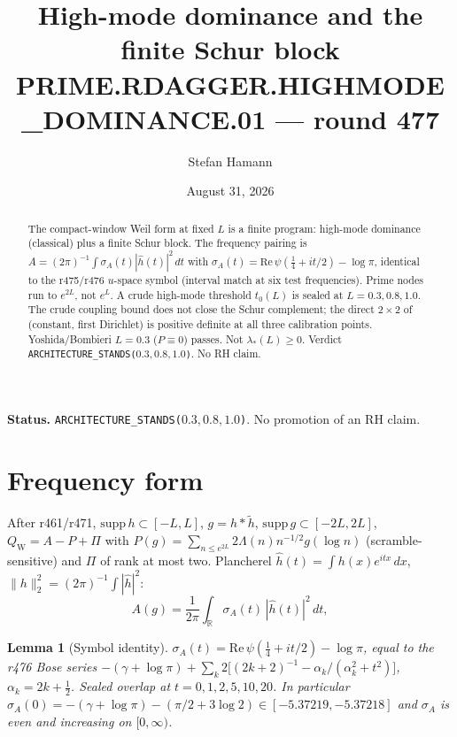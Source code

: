 \documentclass[11pt]{article}
\title{\bfseries High-mode dominance and the finite Schur block\\[2mm]
\large PRIME.RDAGGER.HIGHMODE\_DOMINANCE.01 --- round 477}
\author{Stefan Hamann}
\date{August 31, 2026}
\newtheorem{lemma}{Lemma}
\theoremstyle{remark}
\newcommand{\QW}{Q_{\mathrm W}}
\begin{document}
\maketitle

\begin{abstract}\noindent
The compact-window Weil form at fixed $L$ is a finite program:
high-mode dominance (classical) plus a finite Schur block.
The frequency pairing is
$A=(2\pi)^{-1}\int\sigma_A(t)|\hat h(t)|^2\,dt$ with
$\sigma_A(t)=\mathrm{Re}\,\psi(\tfrac14+it/2)-\log\pi$,
identical to the r475/r476 $u$-space symbol (interval match at
six test frequencies).  Prime nodes run to $e^{2L}$, not $e^L$.
A crude high-mode threshold $t_0(L)$ is sealed at $L=0.3,0.8,1.0$.
The crude coupling bound does not close the Schur complement;
the direct $2\times2$ of (constant, first Dirichlet) is positive
definite at all three calibration points.  Yoshida/Bombieri
$L=0.3$ ($P\equiv0$) passes.  Not $\lambda_*(L)\ge0$.
Verdict \texttt{ARCHITECTURE\_STANDS($0.3,0.8,1.0$)}.
No RH claim.
\end{abstract}

\medskip\noindent
\textbf{Status.}\enspace
\texttt{ARCHITECTURE\_STANDS($0.3,0.8,1.0$)}.
No promotion of an RH claim.

\begin{center}
\end{center}

\section{Frequency form}

After r461/r471, $\mathrm{supp}\,h\subset[-L,L]$,
$g=h*\widetilde h$, $\mathrm{supp}\,g\subset[-2L,2L]$,
$\QW=A-P+\Pi$ with
$P(g)=\sum_{n\le e^{2L}}2\Lambda(n)n^{-1/2}g(\log n)$
(scramble-sensitive) and $\Pi$ of rank at most two.
Plancherel $\hat h(t)=\int h(x)e^{itx}\,dx$,
$\|h\|_2^2=(2\pi)^{-1}\int|\hat h|^2$:
\[
 A(g)=\frac1{2\pi}\int_{\mathbb R}\sigma_A(t)\,|\hat h(t)|^2\,dt,
\]
\begin{lemma}[Symbol identity]\label{lem:sig}
$\sigma_A(t)=\mathrm{Re}\,\psi(\tfrac14+it/2)-\log\pi$,
equal to the r476 Bose series
$-(\gamma+\log\pi)+\sum_k 2\bigl[(2k+2)^{-1}-\alpha_k/(\alpha_k^2+t^2)\bigr]$,
$\alpha_k=2k+\tfrac12$.  Sealed overlap at
$t=0,1,2,5,10,20$.  In particular
$\sigma_A(0)=-(\gamma+\log\pi)-(\pi/2+3\log2)\in[-5.37219,-5.37218]$
and $\sigma_A$ is even and increasing on $[0,\infty)$.
\end{lemma}
\end{document}
